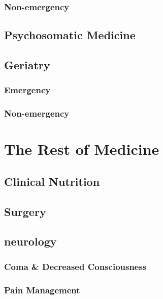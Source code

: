 \documentclass[
  letterpaper,
  DIV=11,
  numbers=noendperiod]{scrreprt}
\begin{document}
\section{Non-emergency}\label{non-emergency}

\chapter{Psychosomatic Medicine}\label{psychosomatic-medicine}

\chapter{Geriatry}\label{geriatry}

\section{Emergency}\label{emergency-1}

\section{Non-emergency}\label{non-emergency-1}

\part{The Rest of Medicine}

\chapter{Clinical Nutrition}\label{clinical-nutrition}

\chapter{Surgery}\label{surgery}

\chapter{neurology}\label{neurology}

\section{Coma \& Decreased
Consciousness}\label{coma-decreased-consciousness}

\section{Pain Management}\label{pain-management}
\end{document}
